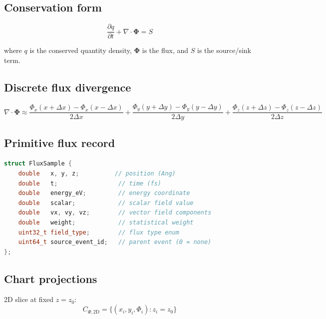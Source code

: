 \documentclass[11pt, a4paper, oneside]{article}
\newcommand{\Phivec}{\bm{\Phi}}
\begin{document}
\subsection{Conservation form}

\begin{equation}
  \frac{\partial q}{\partial t} + \nabla \cdot \Phivec = S
  \label{eq:conservation}
\end{equation}

where $q$ is the conserved quantity density, $\Phivec$ is the flux, and $S$
is the source/sink term.

\subsection{Discrete flux divergence}

\begin{equation}
  \nabla \cdot \Phivec \approx
  \frac{\Phi_x(x+\Delta x) - \Phi_x(x-\Delta x)}{2\Delta x}
  + \frac{\Phi_y(y+\Delta y) - \Phi_y(y-\Delta y)}{2\Delta y}
  + \frac{\Phi_z(z+\Delta z) - \Phi_z(z-\Delta z)}{2\Delta z}
  \label{eq:div_discrete}
\end{equation}

\subsection{Primitive flux record}

\begin{lstlisting}[language=C++, caption={Primitive \texttt{.flux} record.}]
struct FluxSample {
    double   x, y, z;          // position (Ang)
    double   t;                 // time (fs)
    double   energy_eV;         // energy coordinate
    double   scalar;            // scalar field value
    double   vx, vy, vz;        // vector field components
    double   weight;            // statistical weight
    uint32_t field_type;        // flux type enum
    uint64_t source_event_id;   // parent event (0 = none)
};
\end{lstlisting}

\subsection{Chart projections}

2D slice at fixed $z = z_0$:
\begin{equation}
  C_{\Phi,\mathrm{2D}} = \{(x_i, y_i, \Phi_i) : z_i = z_0\}
  \label{eq:c_flux2d}
\end{equation}
\end{document}
